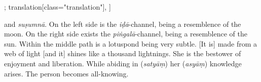 \begin{alignment}[
    texts=edition[class="edition"];
    translation[class="translation"],
  ]
\begin{translation}
\begin{tlate}
and \textit{suṣumnā}. On the left side is the \textit{iḍā}-channel, being a resemblence of the moon. On the right side exists the \textit{piṅgalā}-channel, being a resemblence of the sun. Within the middle path is a lotuspond being very subtle.\textsuperscript{\coro{[\lowroman{10}]}} [It is] made from a web of light [and it] shines like a thousand lightnings. She  is the bestower of enjoyment and liberation. While abiding in (\textit{satyāṃ}) her (\textit{asyāṃ}) knowledge arises. The person becomes all-knowing. \vspace*{\fill}
    \end{tlate}
    \ekdpb*{}
   \end{translation}
 \end{alignment}

